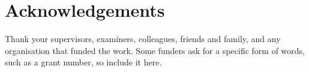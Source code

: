 \chapter*{Acknowledgements}

Thank your supervisors, examiners, colleagues, friends and family, and
any organisation that funded the work. Some funders ask for a specific
form of words, such as a grant number, so include it here.
